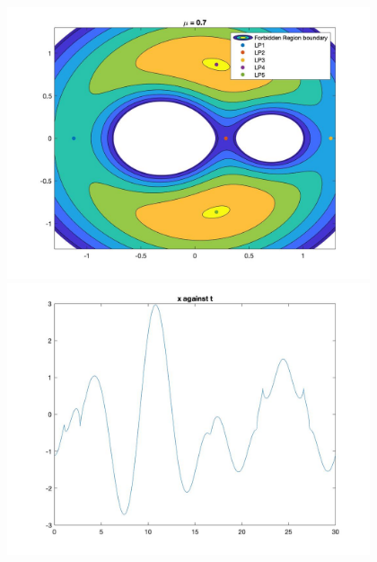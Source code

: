 \documentclass[11pt]{article}
\begin{document}
\begin{figure}[H]
\includegraphics[width = 12cm, height = 8cm]{Q4(3)}
\includegraphics[width = 12cm, height = 8cm]{Q4(4)}
\end{figure}
\end{document}
